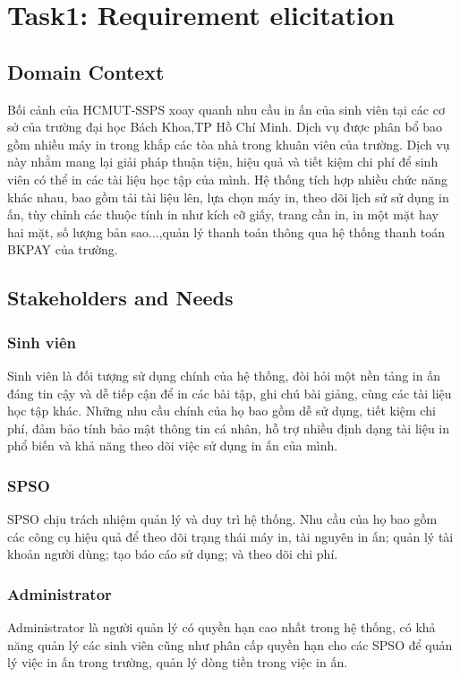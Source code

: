 \section{Task1: Requirement elicitation}
\subsection{Domain Context}
Bối cảnh của HCMUT-SSPS xoay quanh nhu cầu in ấn của sinh viên tại các cơ sở của trường đại học Bách Khoa,TP Hồ Chí Minh. Dịch vụ được phân bổ bao gồm nhiều máy in trong khắp các tòa nhà trong khuân viên của trường. Dịch vụ này nhằm mang lại giải pháp thuận tiện, hiệu quả và tiết kiệm chi phí để sinh viên có thể in các tài liệu học tập của mình. Hệ thống tích hợp nhiều chức năng khác nhau, bao gồm tải tài liệu lên, lựa chọn máy in, theo dõi lịch sử sử dụng in ấn, tùy chỉnh các thuộc tính in như kích cỡ giấy, trang cần in, in một mặt hay hai mặt, số lượng bản sao...,quản lý thanh toán thông qua hệ thống thanh toán BKPAY của trường.

\subsection{Stakeholders and Needs}
\subsubsection{Sinh viên}
Sinh viên là đối tượng sử dụng chính của hệ thống, đòi hỏi một nền tảng in ấn đáng tin cậy và dễ tiếp cận để in các bài tập, ghi chú bài giảng, cùng các tài liệu học tập khác. Những nhu cầu chính của họ bao gồm dễ sử dụng, tiết kiệm chi phí, đảm bảo tính bảo mật thông tin cá nhân, hỗ trợ nhiều định dạng tài liệu in phổ biến và khả năng theo dõi việc sử dụng in ấn của mình.

\subsubsection{SPSO}
SPSO chịu trách nhiệm quản lý và duy trì hệ thống. Nhu cầu của họ bao gồm các công cụ hiệu quả để theo dõi trạng thái máy in, tài nguyên in ấn; quản lý tài khoản người dùng; tạo báo cáo sử dụng; và theo dõi chi phí.

\subsubsection{Administrator}
Administrator là người quản lý có quyền hạn cao nhất trong hệ thống, có khả năng quản lý các sinh viên cũng như phân cấp quyền hạn cho các SPSO để quản lý việc in ấn trong trường, quản lý dòng tiền trong việc in ấn.

